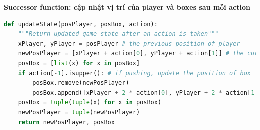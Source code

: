 \documentclass[12pt]{article}
\begin{document}
\begin{itemize}
	\noindent \hspace*{-1em}\textbf{
		Successor function: cập nhật vị trí của player và boxes sau mỗi action}
	\begin{tcolorbox}[boxrule=0.5pt, colback=white]
		\begin{lstlisting}[language=python, numbers=none, basicstyle=\ttfamily\footnotesize]		
def updateState(posPlayer, posBox, action):
	"""Return updated game state after an action is taken"""
	xPlayer, yPlayer = posPlayer # the previous position of player
	newPosPlayer = [xPlayer + action[0], yPlayer + action[1]] # the current position of player
	posBox = [list(x) for x in posBox]
	if action[-1].isupper(): # if pushing, update the position of box
		posBox.remove(newPosPlayer)
		posBox.append([xPlayer + 2 * action[0], yPlayer + 2 * action[1]])
	posBox = tuple(tuple(x) for x in posBox)
	newPosPlayer = tuple(newPosPlayer)
	return newPosPlayer, posBox
		\end{lstlisting}
		\end{tcolorbox}

\end{itemize}



 
\end{document}
